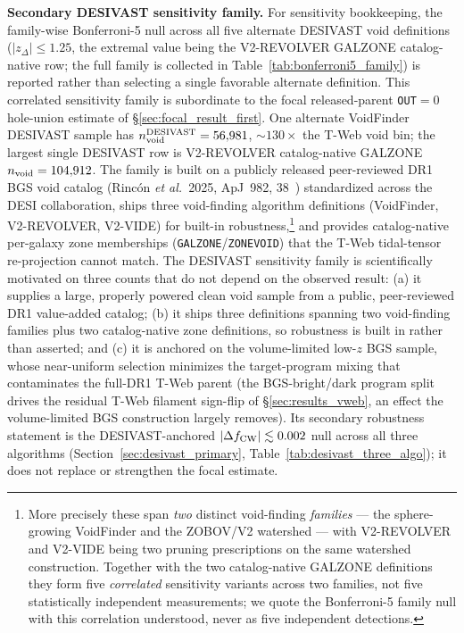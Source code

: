 \documentclass[twocolumn,linenumbers]{aastex702}
\begin{document}
\textbf{Secondary DESIVAST sensitivity family.}
For sensitivity bookkeeping, the family-wise Bonferroni-5 null across
all five alternate DESIVAST void definitions
($|z_\Delta|\!\le\!1.25$, the extremal value being the V2-REVOLVER
GALZONE catalog-native row; the full family is collected in
Table~\ref{tab:bonferroni5_family}) is reported rather than selecting a
single favorable alternate definition. This correlated sensitivity
family is subordinate to the focal released-parent \texttt{OUT}$=0$
hole-union estimate of \S\ref{sec:focal_result_first}. One alternate
VoidFinder DESIVAST sample has $n_{\rm void}^{\rm DESIVAST} =
56{,}981$, ${\sim}130\times$ the T-Web void bin; the largest single DESIVAST row
is V2-REVOLVER catalog-native GALZONE $n_{\rm void}=104{,}912$. The family is built on a
publicly released peer-reviewed
DR1 BGS void catalog (Rinc\'on \textit{et al.}\ 2025,
ApJ~982, 38~\cite{DESIVAST2025}) standardized across the
DESI collaboration, ships three void-finding algorithm
definitions (VoidFinder, V2-REVOLVER, V2-VIDE) for built-in
robustness,\footnote{More precisely these span \emph{two} distinct
void-finding \emph{families} --- the sphere-growing VoidFinder and the
ZOBOV/V2 watershed --- with V2-REVOLVER and V2-VIDE being two pruning
prescriptions on the same watershed construction. Together with the two
catalog-native GALZONE definitions they form five \emph{correlated}
sensitivity variants across two families, not five statistically
independent measurements; we quote the Bonferroni-5 family null with
this correlation understood, never as five independent detections.}
and
provides catalog-native per-galaxy zone memberships
(\texttt{GALZONE}/\texttt{ZONEVOID}) that the T-Web tidal-tensor
re-projection cannot match. The DESIVAST sensitivity family is
scientifically motivated on three
counts that do not depend on the observed result: (a) it supplies a
large, properly powered clean void sample from a public, peer-reviewed
DR1 value-added catalog; (b) it ships three definitions spanning two
void-finding families plus two catalog-native zone definitions, so robustness is
built in rather than asserted; and (c) it is anchored on the
volume-limited low-$z$ BGS sample, whose near-uniform selection
minimizes the target-program mixing that contaminates the full-DR1
T-Web parent (the BGS-bright/dark program split drives the residual
T-Web filament sign-flip of \S\ref{sec:results_vweb}, an effect the
volume-limited BGS construction largely removes). Its secondary
robustness statement is the DESIVAST-anchored
$|\Delta f_{\rm CW}| \lesssim 0.002$ null across all three algorithms
(Section~\ref{sec:desivast_primary}, Table~\ref{tab:desivast_three_algo});
it does not replace or strengthen the focal estimate.
\end{document}
